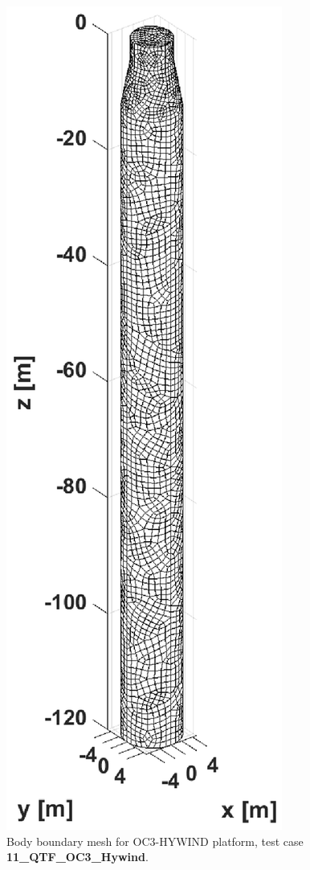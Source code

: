 \documentclass[12pt,a4paper,titlepage]{article}
\begin{document}
\begin{figure}[h!tbp]
\includegraphics[scale=0.5,trim = 160mm 0mm 160mm 0mm, clip]{figures/OC3_HYWIND/bodyMesh.eps}
\caption{Body boundary mesh for OC3-HYWIND platform, test case \textbf{11\_QTF\_OC3\_Hywind}.}\label{fig:meshesHYWIND}
\end{figure}
\end{document}
